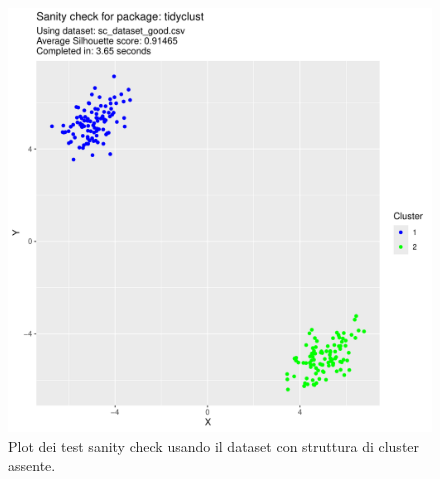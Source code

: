 \documentclass[12pt]{report}
\begin{document}
\begin{figure}[h]
\begin{boxedminipage}{0.5\textwidth}
				\end{boxedminipage}
				\begin{boxedminipage}{0.5\textwidth}
					\includegraphics[width = \textwidth, page = 2]{results/results_TIDYCLUST.pdf}
				\end{boxedminipage}
				\begin{boxedminipage}{0.5\textwidth}
				\end{boxedminipage}
				\caption{Plot dei test sanity check usando il dataset con struttura di cluster
				assente.}
				\label{fig:bad}
			\end{figure}
\end{document}
